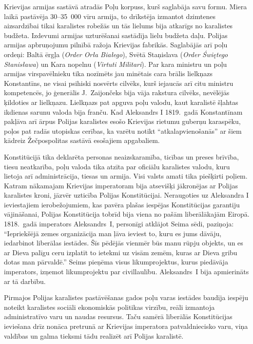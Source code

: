 \documentclass[twoside,a5paper,12pt,fleqn,openany]{extbook}
\newcommand{\pltxti}[1]{\textit{\textpolish{#1}}}
\newcommand{\latxti}[1]{\textit{\textlatin{#1}}}
\begin{document}
Krievijas armijas sastāvā atradās Poļu korpuss, kurš saglabāja savu formu. Miera laikā pastāvēja 30--35~000 vīru armija, to drīkstēja izmantot dzimtenes aizsardzībai tikai karalistes robežās un tās lielums bija atkarīgs no karalistes budžeta. Izdevumi armijas uzturēšanai sastādīja lielu budžeta daļu. Polijas armijas apbruņojumu pilnībā ražoja Krievijas fabrikās. Saglabājās arī poļu ordeņi: Baltā ērgļa (\pltxti{Order Orła Białego}), Svētā Staņislava (\pltxti{Order Świętego Stanisława}) un Kara nopelnu (\latxti{Virtuti Militari}). Par kara ministru un poļu armijas virspavēlnieku tika nozīmēts jau minētais cara brālis lielkņazs Konstantīns, ne visai psihiski nosvērts cilvēks, kurš iejaucās arī citu ministru kompetencēs, jo ģenerālis J.~Zaijončeks bija vāja rakstura cilvēks, nevēlējās ķildoties ar lielkņazu. Lielkņazs pat apguva poļu valodu, kaut karalistē šļahtas ikdienas sarunu valoda bija franču. Kad Aleksandrs I 1819.~gadā Konstantīnam pakļāva arī ārpus Polijas karalistes esošo Krievijas rietumu guberņu karaspēku, poļos pat radās utopiskas cerības, ka varētu notikt ``atkalapvienošanās'' ar šiem kādreiz Žečpospolitas sastāvā esošajiem apgabaliem.

Konstitūcijā tika deklarēta personas neaizskaramība, ticības un preses brīvība, tiesu neatkarība, poļu valoda tika atzīta par oficiālu karalistes valodu, kuru lietoja arī administrācija, tiesas un armija. Visi valsts amati tika piešķirti poļiem. Katram nākamajam Krievijas imperatoram bija atsevišķi jākronējas ar Polijas karalistes kroni, jāzvēr uzticība Polijas Konstitūcijai. Neraugoties uz Aleksandra I ieviestajiem ierobežojumiem, kas pavēra plašas iespējas Konstitūcijas garantiju vājināšanai, Polijas Konstitūcija tobrīd bija viena no pašām liberālākajām Eiropā. 1818.~gadā imperators Aleksandrs~I, personīgi atklājot Seima sēdi, paziņoja: ``Iepriekšējā zemes organizācija man ļāva ieviest to, kuru es jums dāvāju, iedarbinot liberālas iestādes. Šīs pēdējās vienmēr būs manu rūpju objekts, un es ar Dieva palīgu ceru izplatīt to ietekmi uz visām zemēm, kuras ar Dieva gribu dotas man pārvaldē.'' Seims pieņēma visus likumprojektus, kurus piedāvāja imperators, izņemot likumprojektu par civillaulību. Aleksandrs~I bija apmierināts ar tā darbību.

Pirmajos Polijas karalistes pastāvēšanas gados poļu varas iestādes baudīja iespēju noteikt karalistes sociāli ekonomiskās politikas virzību, reāli izmantoja administratīvo varu un naudas resursus. Taču samērā liberālās Konstitūcijas ieviešana drīz nonāca pretrunā ar Krievijas imperatora patvaldniecisko varu, viņa valdības un galma tieksmi tādu realizēt arī Polijas karalistē.
\end{document}
